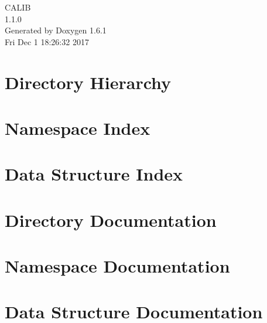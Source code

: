 \documentclass[a4paper]{book}
\begin{document}
\begin{titlepage}
\vspace*{7cm}
\begin{center}
{\Large CALIB \\[1ex]\large 1.1.0 }\\
\vspace*{1cm}
{\large Generated by Doxygen 1.6.1}\\
\vspace*{0.5cm}
{\small Fri Dec 1 18:26:32 2017}\\
\end{center}
\end{titlepage}
\clearemptydoublepage
{}
\tableofcontents
\clearemptydoublepage
{}
\chapter{Directory Hierarchy}

\chapter{Namespace Index}

\chapter{Data Structure Index}

\chapter{Directory Documentation}




\chapter{Namespace Documentation}

\chapter{Data Structure Documentation}






















\printindex
\end{document}
